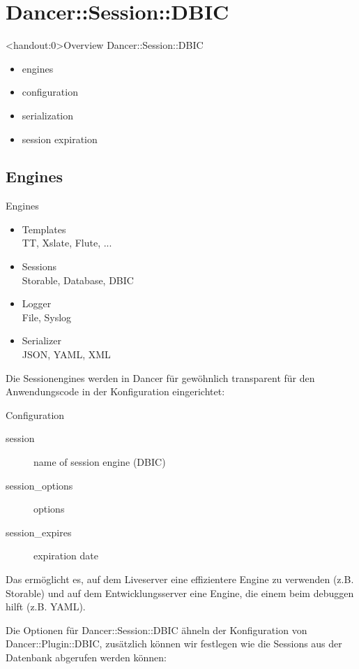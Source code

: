 \section{Dancer::Session::DBIC}

\begin{frame}<handout:0>{Overview Dancer::Session::DBIC}
\begin{itemize}
\item engines
\item configuration
\item serialization
\item session expiration
\end{itemize}
\end{frame}

\subsection{Engines}
\begin{frame}{Engines}
\begin{itemize}
\item Templates \\
TT, Xslate, Flute, ...
\item Sessions \\ 
Storable, Database, DBIC
\item Logger \\
File, Syslog
\item Serializer  \\
JSON, YAML, XML
\end{itemize}
\end{frame}

Die Sessionengines werden in Dancer für gewöhnlich transparent
für den Anwendungscode in der Konfiguration eingerichtet:

\begin{frame}{Configuration}
\begin{description}
\item[session] name of session engine (DBIC)
\item[session\_options] options
\item[session\_expires] expiration date
\end{description}
\end{frame}

Das ermöglicht es, auf dem Liveserver eine effizientere Engine
zu verwenden (z.B. Storable) und auf dem Entwicklungsserver
eine Engine, die einem beim debuggen hilft (z.B. YAML).

Die Optionen für Dancer::Session::DBIC ähneln der Konfiguration von
Dancer::Plugin::DBIC, zusätzlich können wir festlegen wie
die Sessions aus der Datenbank abgerufen werden können:

